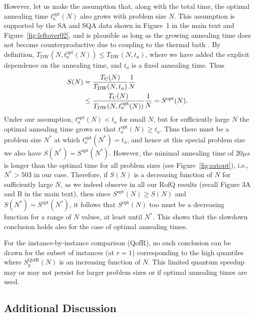 However, let us make the assumption that, along with the total time, the optimal annealing time $t_a^{\textrm{opt}}(N)$ also grows with problem size $N$. This assumption is supported by the SA and SQA data shown in Figure~1 in the main text and Figure~\ref{fig:leftover02}, and is plausible as long as the growing annealing time does not become counterproductive due to coupling to the thermal bath \cite{PhysRevLett.95.250503}. By definition,  $T_{\textrm{DW}}(N,t_a^{\textrm{opt}}(N)) \leq T_{\textrm{DW}}(N,t_a)$, where we have added the explicit dependence on the annealing time, and $t_a$ is a fixed annealing time. Thus
\begin{align}
S(N) &= \frac{T_{\textrm{C}}(N)}{T_{\textrm{DW}}(N,t_a)}\frac{1}{N}  \\
&\leq \frac{T_{\textrm{C}}(N)}{T_{\textrm{DW}}(N,t_a^{\textrm{opt}}(N))}\frac{1}{N} = S^{\textrm{opt}}(N) \notag.
\end{align}
Under our assumption, $t_a^{\textrm{opt}}(N) < t_a $ for small $N$, but for sufficiently large $N$ the optimal annealing time grows so that $t_a^{\textrm{opt}}(N) \geq t_a$. Thus there must be a problem size $N^*$ at which $t_a^{\textrm{opt}}(N^*) = t_a$, and hence at this special problem size we also have $S(N^*) = S^{\textrm{opt}}(N^*)$. However, the minimal annealing time of $20\mu s$ is longer than the optimal time for all problem sizes (see Figure~\ref{fig:satopt}), i.e., $N^*>503$ in our case. Therefore, if $S(N)$ is a decreasing function of $N$ for sufficiently large $N$, as we indeed observe in all our RofQ results (recall Figure 3A and B in the main text), then since $S^{\textrm{opt}}(N) \geq S(N)$ {and} $S(N^*) = S^{\textrm{opt}}(N^*)$, it follows that $S^{\textrm{opt}}(N)$ too must be a decreasing function for a range of $N$ values, at least until $N^*$. This shows that the slowdown conclusion holds also for the case of optimal annealing times.

For the instance-by-instance comparison (QofR), no such conclusion can be drawn for the subset of instances (at $r=1$) corresponding to the high quantiles where $S_q^{\textrm{QofR}}(N)$ is an {increasing} function of $N$. This limited quantum speedup may or may not persist for larger problem sizes or if optimal annealing times are used. \\

\subsection{Additional Discussion}\label{subsec:additional}

